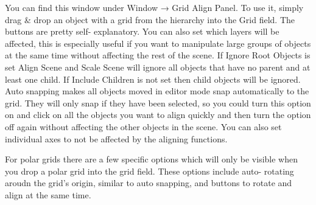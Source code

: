 You can find this window under Window → Grid Align Panel. To use it, simply drag \& drop an object with a grid from the hierarchy into the Grid field. The buttons are pretty self-\/ explanatory. You can also set which layers will be affected, this is especially useful if you want to manipulate large groups of objects at the same time without affecting the rest of the scene. If Ignore Root Objects is set Align Scene and Scale Scene will ignore all objects that have no parent and at least one child. If Include Children is not set then child objects will be ignored. Auto snapping makes all objects moved in editor mode snap automatically to the grid. They will only snap if they have been selected, so you could turn this option on and click on all the objects you want to align quickly and then turn the option off again without affecting the other objects in the scene. You can also set individual axes to not be affected by the aligning functions.



For polar grids there are a few specific options which will only be visible when you drop a polar grid into the grid field. These options include auto-\/ rotating aroudn the grid’s origin, similar to auto snapping, and buttons to rotate and align at the same time. 